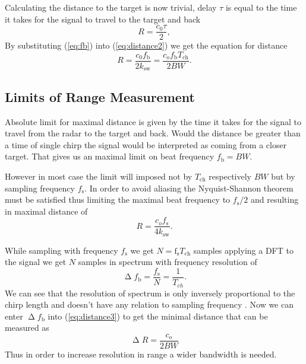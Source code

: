Calculating the distance to the target is now trivial, delay $\tau$ is equal to the time it takes for the signal to travel to the target and back
\begin{equation}
	R = \frac{c_0 \tau}{2},
	\label{eq:distance2}
\end{equation}
By substituting (\ref{eq:fb}) into (\ref{eq:distance2}) we get the equation for distance
\begin{equation}
	R = \frac{c_0 f_\mathrm{b}}{2k_\mathrm{sw}}= \frac{c_o f_\mathrm{b} T_{\mathrm{ch}}}{2 BW}.
	\label{eq:distance3}
\end{equation}


\subsection{Limits of Range Measurement}

Absolute limit for maximal distance is given by the time it takes for the signal to travel from the radar to the target and back.
Would the distance be greater than a time of single chirp the signal would be interpreted as coming from a closer target.
That gives us an maximal limit on beat frequency $f_\mathrm{b} = BW$.

However in most case the limit will imposed not by $T_\mathrm{ch}$ respectively $BW$ but by sampling frequency $f_\mathrm{s}$.
In order to avoid aliasing the Nyquist-Shannon theorem must be satisfied thus limiting the maximal beat frequency to $f_\mathrm{s}/2$ and resulting in maximal distance of
\begin{equation}
	R = \frac{c_o f_\mathrm{s}}{4k_\mathrm{sw}}.
	\label{eq:distance4max}
\end{equation}

While sampling with frequency $f_\mathrm{s}$ we get $N =\mathrm{f}_\mathrm{s} T_\mathrm{ch}$ samples applying a DFT to the signal we get $N$ samples in spectrum with frequency resolution of
\begin{equation}
	\upDelta f_\mathrm{b} = \frac{f_\mathrm{s}}{N} = \frac{1}{T_{ch}}.
	\label{eq:resolution}
\end{equation}
We can see that the resolution of spectrum is only inversely proportional to the chirp length and doesn't have any relation to sampling frequency \cite{jankiraman2018}.
Now we can enter $\upDelta f_\mathrm{b}$ into (\ref{eq:distance3}) to get the minimal distance that can be measured as
\begin{equation}
	\upDelta R = \frac{c_o}{2BW}
	\label{eq:distance5min}
\end{equation}
Thus in order to increase resolution in range a wider bandwidth is needed.

